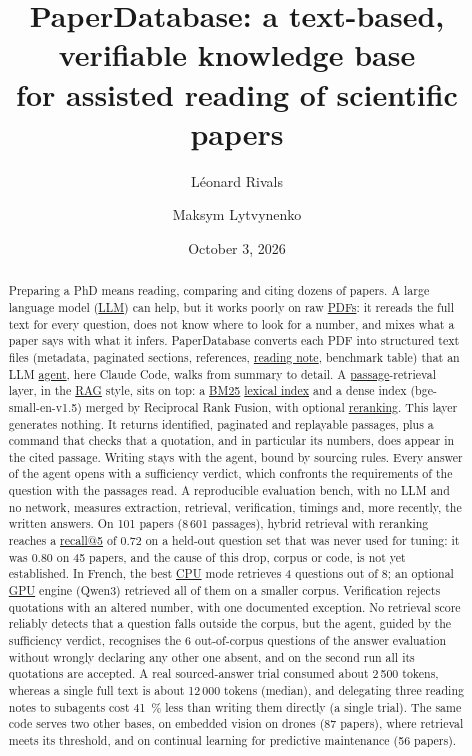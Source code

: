 \documentclass[11pt,a4paper]{article}
\title{\textbf{PaperDatabase}: a text-based, verifiable knowledge base\\
  for assisted reading of scientific papers}
\author{Léonard Rivals \and Maksym Lytvynenko}
\date{October 3, 2026}
\newcommand{\gl}[2]{\hyperlink{gl:#1}{\textcolor{glcolor}{#2}}}
\begin{document}
\maketitle


\begin{abstract}
Preparing a PhD means reading, comparing and citing dozens of papers. A large language
model (\gl{LLM}{LLM}) can help, but it works poorly on raw \gl{PDF}{PDFs}: it rereads the full text for every
question, does not know where to look for a number, and mixes what a paper says with what it
infers. PaperDatabase converts each PDF into structured text files (metadata, paginated
sections, references, \gl{fiche}{reading note}, benchmark table) that an LLM \gl{agent}{agent}, here Claude Code,
walks from summary to detail. A \gl{passage}{passage}-retrieval layer, in the \gl{RAG}{RAG} style, sits on top: a
\gl{BM25}{BM25} \gl{index}{lexical index} and a dense index (bge-small-en-v1.5) merged by Reciprocal Rank Fusion,
with optional \gl{reranking}{reranking}. This layer generates nothing. It returns identified, paginated and
replayable passages, plus a command that checks that a quotation, and in particular its
numbers, does appear in the cited passage. Writing stays with the agent, bound by sourcing
rules. Every answer of the agent opens with a sufficiency verdict, which confronts the
requirements of the question with the passages read. A reproducible evaluation bench, with no
LLM and no network, measures extraction, retrieval, verification, timings and, more recently,
the written answers. On 101 papers (8\,601 passages), hybrid retrieval with reranking reaches
a \gl{recall}{recall@5} of 0.72 on a held-out question set that was never used for tuning: it was
0.80 on 45 papers, and the cause of this drop, corpus or code, is not yet established.
In French, the best \gl{CPU}{CPU} mode retrieves 4 questions out of 8; an optional \gl{GPU}{GPU} engine
(Qwen3) retrieved all of them on a smaller corpus. Verification rejects quotations with an
altered number, with one documented exception. No retrieval score reliably detects that a
question falls outside the corpus, but the agent, guided by the sufficiency verdict,
recognises the 6 out-of-corpus questions of the answer evaluation without wrongly declaring
any other one absent, and on the second run all its quotations are accepted. A real
sourced-answer trial consumed about 2\,500 tokens, whereas a single full text is about
12\,000 tokens (median), and delegating three reading notes to subagents cost 41~\% less than
writing them directly (a single trial). The same code serves two other bases, on embedded
vision on drones (87 papers), where retrieval meets its threshold, and on continual learning
for predictive maintenance (56 papers).
\end{abstract}
\end{document}
